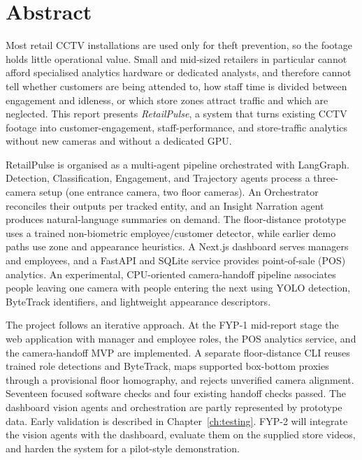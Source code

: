 \chapter*{Abstract}
Most retail CCTV installations are used only for theft prevention, so the footage holds little operational value. Small and mid-sized retailers in particular cannot afford specialised analytics hardware or dedicated analysts, and therefore cannot tell whether customers are being attended to, how staff time is divided between engagement and idleness, or which store zones attract traffic and which are neglected. This report presents \textit{RetailPulse}, a system that turns existing CCTV footage into customer-engagement, staff-performance, and store-traffic analytics without new cameras and without a dedicated GPU.

RetailPulse is organised as a multi-agent pipeline orchestrated with LangGraph. Detection, Classification, Engagement, and Trajectory agents process a three-camera setup (one entrance camera, two floor cameras). An Orchestrator reconciles their outputs per tracked entity, and an Insight Narration agent produces natural-language summaries on demand. The floor-distance prototype uses a trained non-biometric employee/customer detector, while earlier demo paths use zone and appearance heuristics. A Next.js dashboard serves managers and employees, and a FastAPI and SQLite service provides point-of-sale (POS) analytics. An experimental, CPU-oriented camera-handoff pipeline associates people leaving one camera with people entering the next using YOLO detection, ByteTrack identifiers, and lightweight appearance descriptors.

The project follows an iterative approach. At the FYP-1 mid-report stage the web application with manager and employee roles, the POS analytics service, and the camera-handoff MVP are implemented. A separate floor-distance CLI reuses trained role detections and ByteTrack, maps supported box-bottom proxies through a provisional floor homography, and rejects unverified camera alignment. Seventeen focused software checks and four existing handoff checks passed. The dashboard vision agents and orchestration are partly represented by prototype data. Early validation is described in Chapter~\ref{ch:testing}. FYP-2 will integrate the vision agents with the dashboard, evaluate them on the supplied store videos, and harden the system for a pilot-style demonstration.
